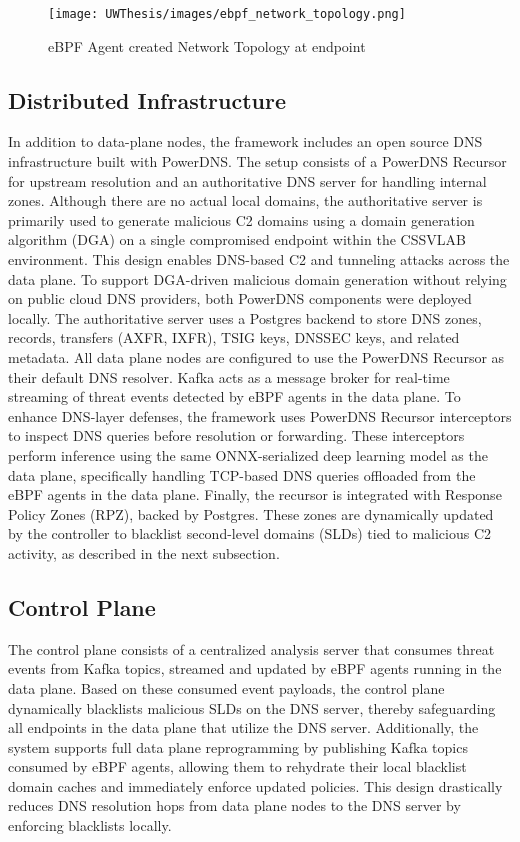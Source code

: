 \documentclass [11pt, proquest] {uwthesis}[2020/02/24]
\begin{document}
\begin{figure}[htbp]
\centering
\texttt{[image: UWThesis/images/ebpf\_network\_topology.png]}
\caption{eBPF Agent created Network Topology at endpoint}
\label{sec:dp_eBPF_agent_net_topology}
\end{figure}

\vspace{-1em}
\subsection{Distributed Infrastructure}
In addition to data-plane nodes, the framework includes an open source DNS infrastructure built with PowerDNS. The setup consists of a PowerDNS Recursor for upstream resolution and an authoritative DNS server for handling internal zones. Although there are no actual local domains, the authoritative server is primarily used to generate malicious C2 domains using a domain generation algorithm (DGA) on a single compromised endpoint within the CSSVLAB environment. This design enables DNS-based C2 and tunneling attacks across the data plane. To support DGA-driven malicious domain generation without relying on public cloud DNS providers, both PowerDNS components were deployed locally. The authoritative server uses a Postgres backend to store DNS zones, records, transfers (AXFR, IXFR), TSIG keys, DNSSEC keys, and related metadata. All data plane nodes are configured to use the PowerDNS Recursor as their default DNS resolver. Kafka acts as a message broker for real-time streaming of threat events detected by eBPF agents in the data plane. To enhance DNS-layer defenses, the framework uses PowerDNS Recursor interceptors to inspect DNS queries before resolution or forwarding. These interceptors perform inference using the same ONNX-serialized deep learning model as the data plane, specifically handling TCP-based DNS queries offloaded from the eBPF agents in the data plane. Finally, the recursor is integrated with Response Policy Zones (RPZ), backed by Postgres. These zones are dynamically updated by the controller to blacklist second-level domains (SLDs) tied to malicious C2 activity, as described in the next subsection.

\vspace{-1em}
\subsection{Control Plane}
The control plane consists of a centralized analysis server that consumes threat events from Kafka topics, streamed and updated by eBPF agents running in the data plane. Based on these consumed event payloads, the control plane dynamically blacklists malicious SLDs on the DNS server, thereby safeguarding all endpoints in the data plane that utilize the DNS server. Additionally, the system supports full data plane reprogramming by publishing Kafka topics consumed by eBPF agents, allowing them to rehydrate their local blacklist domain caches and immediately enforce updated policies. This design drastically reduces DNS resolution hops from data plane nodes to the DNS server by enforcing blacklists locally.
\end{document}
